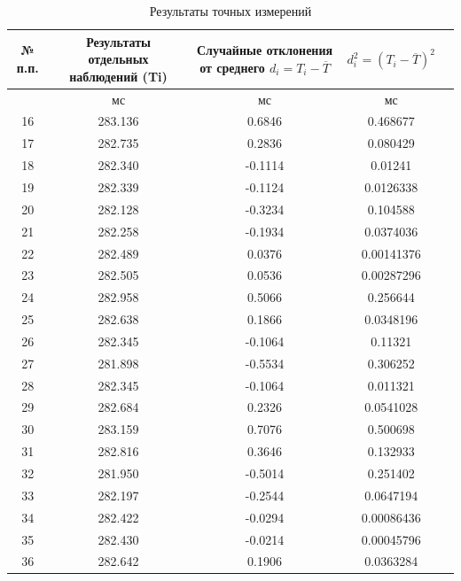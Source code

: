 \begin{center}
\begin{table}[h!]
\centering
\caption{Результаты точных измерений}
\label{tabl:2}
\begin{tabular}{|c|c|c|c|c|}
\hline
\begin{minipage}{7mm}
    № п.п. 
\end{minipage}&
\begin{minipage}{5cm}
    Результаты отдельных наблюдений (Ti)
\end{minipage} &
\begin{minipage}{5cm}
    Случайные отклонения от среднего $d_i = T_i - \overline{T}$
\end{minipage} &
\begin{minipage}{5cm}
     $d_i^2 = (T_i - \overline{T})^2$
\end{minipage}\\
\hline
{}&мс&мс&мс\\
\hline
16& 283.136  &	0.6846 & 0.468677 \\
17& 282.735  &	0.2836 & 0.080429 \\
18& 282.340  &	-0.1114 & 0.01241 \\
19& 282.339  &	-0.1124 & 0.0126338 \\
20& 282.128  &	-0.3234 & 0.104588 \\
21& 282.258  &	-0.1934 & 0.0374036 \\
22& 282.489  &	0.0376 & 0.00141376 \\
23& 282.505  &	0.0536 & 0.00287296 \\
24& 282.958  &	0.5066 & 0.256644 \\
25& 282.638  &	0.1866 & 0.0348196 \\
26& 282.345  &	-0.1064 & 0.11321 \\
27& 281.898  &	-0.5534 & 0.306252 \\
28& 282.345  &	-0.1064 & 0.011321 \\
29& 282.684  &	0.2326 & 0.0541028 \\
30& 283.159  &	0.7076 & 0.500698 \\
31& 282.816  &	0.3646 & 0.132933 \\
32& 281.950  &	-0.5014 & 0.251402 \\
33& 282.197  &	-0.2544 & 0.0647194 \\
34& 282.422  &	-0.0294 & 0.00086436 \\
35& 282.430  &	-0.0214 & 0.00045796 \\
36& 282.642  &	0.1906 & 0.0363284 \\

\end{tabular}
\end{table}
\end{center}
